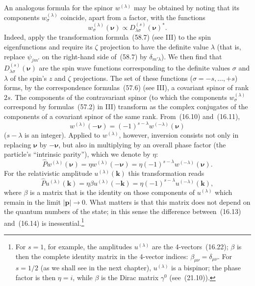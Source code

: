 An analogous formula for the spinor $w^{(\lambda)}$ may be obtained by noting that its components $w^{(\lambda)}_\sigma$ coincide, apart from a factor, with the functions
\begin{equation}
w^{(\lambda)}_\sigma(\boldsymbol\nu)
\propto D^{(s)}_{\lambda\sigma}(\boldsymbol\nu)^*.
\tag{16.11}
\end{equation}
Indeed, apply the transformation formula~(58.7) (see III) to the spin eigenfunctions and require its $\zeta$ projection to have the definite value $\lambda$ (that is, replace $\psi_{jm'}$ on the right-hand side of~(58.7) by $\delta_{m'\lambda}$). We then find that $D^{(s)}_{\lambda\sigma}(\boldsymbol\nu)$ are the spin wave functions corresponding to the definite values $\sigma$ and $\lambda$ of the spin's $z$ and $\zeta$ projections. The set of these functions ($\sigma=-s,\ldots,+s$) forms, by the correspondence formulas~(57.6) (see III), a covariant spinor of rank $2s$. The components of the contravariant spinor (to which the components $w^{(\lambda)}_\sigma$ correspond by formulas~(57.2) in III) transform as the complex conjugates of the components of a covariant spinor of the same rank. From~(16.10) and~(16.11),
\begin{equation}
w^{(\lambda)}(-\boldsymbol\nu)
=(-1)^{s-\lambda}w^{(-\lambda)}(\boldsymbol\nu)
\tag{16.12}
\end{equation}
($s-\lambda$ is an integer). Applied to $w^{(\lambda)}$, however, inversion consists not only in replacing $\boldsymbol\nu$ by $-\boldsymbol\nu$, but also in multiplying by an overall phase factor (the particle's ``intrinsic parity''), which we denote by $\eta$:
\begin{equation}
\widehat P w^{(\lambda)}(\boldsymbol\nu)
=\eta w^{(\lambda)}(-\boldsymbol\nu)
=\eta(-1)^{s-\lambda}w^{(-\lambda)}(\boldsymbol\nu).
\tag{16.13}
\end{equation}
For the relativistic amplitude $u^{(\lambda)}(\mathbf k)$ this transformation reads
\begin{equation}
\widehat P u^{(\lambda)}(\mathbf k)
=\eta\beta u^{(\lambda)}(-\mathbf k)
=\eta(-1)^{s-\lambda}u^{(-\lambda)}(\mathbf k),
\tag{16.14}
\end{equation}
where $\beta$ is a matrix that is the identity on those components of $u^{(\lambda)}$ which remain in the limit $|\mathbf p|\to0$. What matters is that this matrix does not depend on the quantum numbers of the state; in this sense the difference between~(16.13) and~(16.14) is inessential.\footnote{For $s=1$, for example, the amplitudes $u^{(\lambda)}$ are the 4-vectors~(16.22); $\beta$ is then the complete identity matrix in the 4-vector indices: $\beta_{\mu\nu}=\delta_{\mu\nu}$. For $s=1/2$ (as we shall see in the next chapter), $u^{(\lambda)}$ is a bispinor; the phase factor is then $\eta=i$, while $\beta$ is the Dirac matrix $\gamma^0$ (see~(21.10)).}

